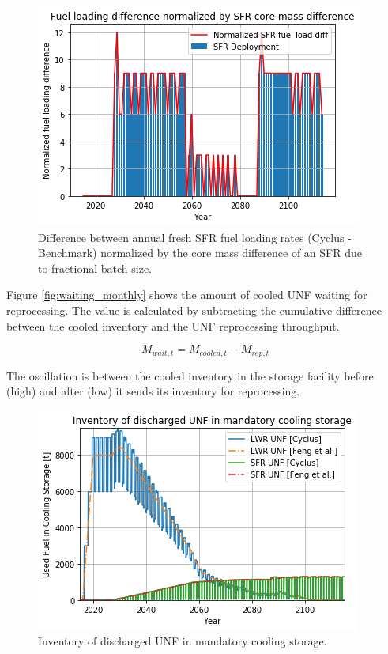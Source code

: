 \begin{figure}[htbp!]
	\begin{center}
		\includegraphics[scale=0.7]{./images/results_18/fuel_load_diff_norm.png}
	\end{center}
	\caption{Difference between annual fresh \gls{SFR} fuel loading rates (Cyclus - Benchmark) normalized by the core mass difference of an \gls{SFR} due to fractional batch size.}
	\label{fig:fuel_load_diff_norm}
\end{figure}


Figure \ref{fig:waiting_monthly} shows the amount of cooled \gls{UNF} waiting for
reprocessing. The value is calculated by subtracting the cumulative difference between
the cooled inventory and the \gls{UNF} reprocessing throughput.

\[ M_{wait, t} = M_{cooled, t} - M_{rep, t} \]

The oscillation is between the cooled inventory in the storage facility before (high)
and after (low) it sends its inventory for reprocessing.

\begin{figure}[htbp!]
	\begin{center}
		\includegraphics[scale=0.7]{./images/results_18/fuel_discharge_monthly.png}
	\end{center}
	\caption{Inventory of discharged \gls{UNF} in mandatory cooling storage.}
	\label{fig:fuel_discharge_monthly}
\end{figure}


